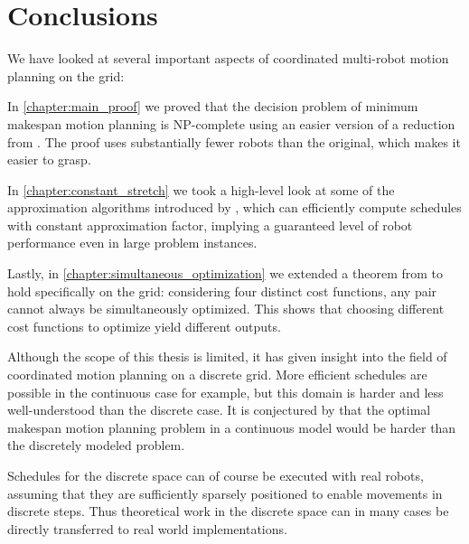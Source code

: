 
\section{Conclusions}

We have looked at several important aspects of coordinated multi-robot motion planning on the grid:

In \cref{chapter:main_proof} we proved that the decision problem of minimum makespan motion planning is NP-complete using an easier version of a reduction from \cite{siamcomp/DemaineFKMS19}.
The proof uses substantially fewer robots than the original, which makes it easier to grasp. 

In \cref{chapter:constant_stretch} we took a high-level look at some of the approximation algorithms introduced by \cite{siamcomp/DemaineFKMS19}, which can efficiently compute schedules with constant approximation factor, implying a guaranteed level of robot performance even in large problem instances.

Lastly, in \cref{chapter:simultaneous_optimization} we extended a theorem from \cite{corr/YuL15c} to hold specifically on the grid: considering four distinct cost functions, any pair cannot always be simultaneously optimized.
This shows that choosing different cost functions to optimize yield different outputs.


Although the scope of this thesis is limited, it has given insight into the field of coordinated motion planning on a discrete grid.
More efficient schedules are possible in the continuous case for example, but this domain is harder and less well-understood than the discrete case.
It is conjectured by \cite{siamcomp/DemaineFKMS19} that the optimal makespan motion planning problem in a continuous model would be harder than the discretely modeled problem. 

Schedules for the discrete space can of course be executed with real robots, assuming that they are sufficiently sparsely positioned to enable movements in discrete steps. 
Thus theoretical work in the discrete space can in many cases be directly transferred to real world implementations.

